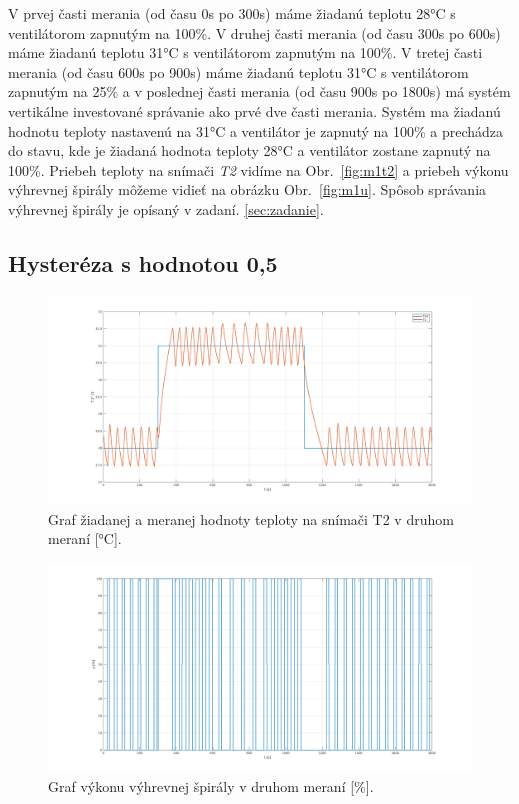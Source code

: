 \documentclass{article}
\begin{document}
V prvej časti merania (od času 0s po 300s) máme žiadanú teplotu 28°C s ventilátorom zapnutým na 100\%.
V druhej časti merania (od času 300s po 600s) máme žiadanú teplotu 31°C s ventilátorom zapnutým na 100\%.
V tretej časti merania (od času 600s po 900s) máme žiadanú teplotu 31°C s ventilátorom zapnutým na 25\% a
v poslednej časti merania (od času 900s po 1800s) má systém vertikálne investované správanie ako prvé
dve časti merania. Systém ma žiadanú hodnotu teploty nastavenú na 31°C a ventilátor je zapnutý na 100\%
a prechádza do stavu, kde je žiadaná hodnota teploty 28°C a ventilátor zostane zapnutý na 100\%.
Priebeh teploty na snímači \textit{T2} vidíme na Obr.~\ref{fig:m1t2} a priebeh výkonu výhrevnej špirály
môžeme vidieť na obrázku Obr.~\ref{fig:m1u}. Spôsob správania výhrevnej špirály je opísaný v zadaní.
\ref{sec:zadanie}.

\clearpage

\subsection{Hysteréza s hodnotou 0,5}
\label{sec:meranie2}

\begin{figure}[!htbp]
	\begin{center}
		\includegraphics[width=\textwidth]{./include/m2T2.png}
	\end{center}
	\caption{Graf žiadanej a meranej hodnoty teploty na snímači T2 v druhom meraní [°C].}
	\label{fig:m2t2}
\end{figure}

\clearpage

\begin{figure}[!htbp]
	\begin{center}
		\includegraphics[width=\textwidth]{./include/m2u.png}
	\end{center}
	\caption{Graf výkonu výhrevnej špirály v druhom meraní [\%].}
	\label{fig:m2u}
\end{figure}
\end{document}
